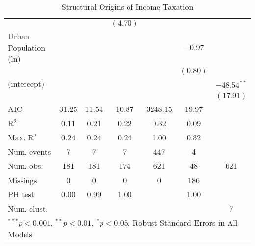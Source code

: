 \documentclass[onesided]{article}\usepackage[]{graphicx}\usepackage[]{color}
\begin{document}
\begin{table}[h]
\begin{center}
\begin{scriptsize}
\begin{tabular}{l c c c c c c }
                                  &               &                & $(4.70)$       &              &             &               \\
Urban Population  (ln)            &               &                &                &              & $-0.97$     &               \\
                                  &               &                &                &              & $(0.80)$    &               \\
(intercept)                       &               &                &                &              &             & $-48.54^{**}$ \\
                                  &               &                &                &              &             & $(17.91)$     \\
\hline
AIC                               & 31.25         & 11.54          & 10.87          & 3248.15      & 19.97       &               \\
R$^2$                             & 0.11          & 0.21           & 0.22           & 0.32         & 0.09        &               \\
Max. R$^2$                        & 0.24          & 0.24           & 0.24           & 1.00         & 0.32        &               \\
Num. events                       & 7             & 7              & 7              & 447          & 4           &               \\
Num. obs.                         & 181           & 181            & 174            & 621          & 48          & 621           \\
Missings                          & 0             & 0              & 0              & 0            & 186         &               \\
PH test                           & 0.00          & 0.99           & 1.00           &              & 1.00        &               \\
Num. clust.                       &               &                &                &              &             & 7             \\
\hline
\multicolumn{7}{l}{\tiny{$^{***}p<0.001$, $^{**}p<0.01$, $^*p<0.05$. Robust Standard Errors in All Models}}
\end{tabular}
\end{scriptsize}
\caption{Structural Origins of Income Taxation}
\label{results:1}
\end{center}
\end{table}
\end{document}
